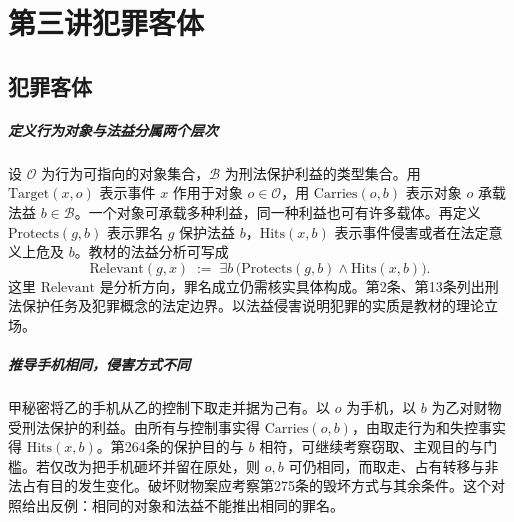 \chapter{第三讲\quad 犯罪客体}
\label{lecture:03}
\par

\section{犯罪客体}

\paragraph{定义\quad 行为对象与法益分属两个层次}
设 \(\mathcal O\) 为行为可指向的对象集合，\(\mathcal B\) 为刑法保护利益的类型集合。用 \(\mathrm{Target}(x,o)\) 表示事件 \(x\) 作用于对象 \(o\in\mathcal O\)，用 \(\mathrm{Carries}(o,b)\) 表示对象 \(o\) 承载法益 \(b\in\mathcal B\)。一个对象可承载多种利益，同一种利益也可有许多载体。再定义 \(\mathrm{Protects}(g,b)\) 表示罪名 \(g\) 保护法益 \(b\)，\(\mathrm{Hits}(x,b)\) 表示事件侵害或者在法定意义上危及 \(b\)。教材的法益分析可写成
\[
 \mathrm{Relevant}(g,x)
 \;:=\;\exists b\,
    \bigl(\mathrm{Protects}(g,b)\land\mathrm{Hits}(x,b)\bigr).
\]
这里 \(\mathrm{Relevant}\) 是分析方向，罪名成立仍需核实具体构成。第2条、第13条列出刑法保护任务及犯罪概念的法定边界。以法益侵害说明犯罪的实质是教材的理论立场。

\paragraph{推导\quad 手机相同，侵害方式不同}
甲秘密将乙的手机从乙的控制下取走并据为己有。以 \(o\) 为手机，以 \(b\) 为乙对财物受刑法保护的利益。由所有与控制事实得 \(\mathrm{Carries}(o,b)\)，由取走行为和失控事实得 \(\mathrm{Hits}(x,b)\)。第264条的保护目的与 \(b\) 相符，可继续考察窃取、主观目的与门槛。若仅改为把手机砸坏并留在原处，则 \(o,b\) 可仍相同，而取走、占有转移与非法占有目的发生变化。破坏财物案应考察第275条的毁坏方式与其余条件。这个对照给出反例：相同的对象和法益不能推出相同的罪名。

